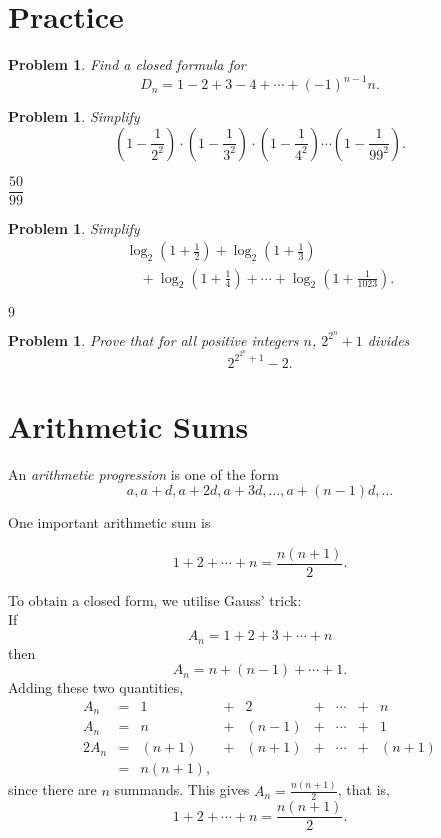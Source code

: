 \documentclass[11pt, openany]{book}
\theoremstyle{change} \theoremheaderfont{\blue\sffamily\bfseries}
\newtheorem{pro}[thm]{Problem}
\theoremstyle{nonumberplain} \theoremheaderfont{\sffamily\bfseries}
\newcommand{\dis}{\displaystyle}
\newcommand{\í}{\'{\i}}
\begin{document}
\section*{Practice}\begin{multicols}{2}\columnseprule 1pt \columnsep 25pt

\begin{pro} Find a closed formula for
$$D_n = 1 - 2 + 3 - 4 + \cdots + (-1)^{n - 1}n.$$ \end{pro}

\begin{pro} Simplify
$$ \left( 1 - \frac{1}{2^2}\right) \cdot \left( 1 - \frac{1}{3^2}\right) \cdot
\left( 1 - \frac{1}{4^2}\right) \cdots \left( 1 -
\frac{1}{99^2}\right) .
$$
\begin{answer}
$\dfrac{50}{99}$
\end{answer}
\end{pro}

\begin{pro} Simplify
$$\begin{array}{l}\log _2 \left( 1 + \frac{1}{2}\right) + \log _2 \left( 1 + \frac{1}{3}\right) \\
\quad + \log _2 \left( 1 + \frac{1}{4}\right) + \cdots + \log _2
\left( 1 + \frac{1}{1023}\right) .\end{array}$$
\begin{answer}
$9$
\end{answer}
\end{pro}
\begin{pro}
Prove that for all positive integers $n$, $2^{2^n} + 1$ divides
$$ 2^{2^{2^n} + 1} - 2.$$ \end{pro}
\end{multicols}
\section{Arithmetic Sums}

An {\em arithmetic progression} is one of the form
$$a, a + d, a + 2d, a + 3d, \ldots, a + (n - 1)d, \ldots$$


One important arithmetic sum is

$$1 + 2 + \cdots + n = \frac{n(n + 1)}{2}.$$

To obtain a closed form, we utilise
Gauss' trick: \\
If
$$ A_n =  1 + 2 + 3 + \cdots + n $$
 then$$ A_n =  n + (n - 1) +  \cdots + 1.$$Adding these two quantities,
$$ \begin{array}{lcccccccc} A_n & = & 1 & + &  2 &  + &  \cdots & + & n \\
{A_n} & {=} & n & + & (n - 1) & + & \cdots & + & 1 \\
2A_n & =  & (n + 1) & + & (n + 1) & + & \cdots & + & (n + 1) \\
  & = & n(n + 1), & & & & & \end{array}$$since there are $n$ summands. This
  gives $A_n = \dis{\frac{n(n + 1)}{2}}$, that is,
\begin{equation} 1 + 2 + \cdots + n = \frac{n(n + 1)}{2}.\end{equation}
\end{document}
